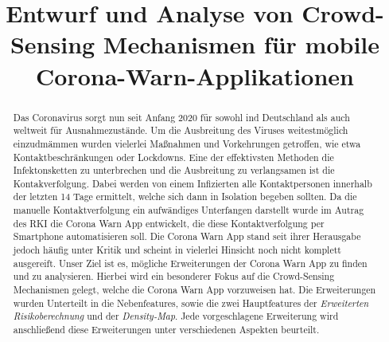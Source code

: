 \documentclass[conference,compsoc]{IEEEtran}
\begin{document}
\title{Entwurf und Analyse von Crowd-Sensing Mechanismen für mobile Corona-Warn-Applikationen}

\author{
\and
{} 
\and
{}
\and
{}
}

\maketitle

\begin{abstract}
Das Coronavirus sorgt nun seit Anfang 2020 für sowohl ind Deutschland als auch weltweit für Ausnahmezustände. 
Um die Ausbreitung des Viruses weitestmöglich einzudmämmen wurden vielerlei Maßnahmen und Vorkehrungen getroffen, wie etwa Kontaktbeschränkungen oder Lockdowns.
Eine der effektivsten Methoden die Infektonsketten zu unterbrechen und die Ausbreitung zu verlangsamen ist die Kontakverfolgung. 
Dabei werden von einem Infizierten alle Kontaktpersonen innerhalb der letzten 14 Tage ermittelt, welche sich dann in Isolation begeben sollten. 
Da die manuelle Kontaktverfolgung ein aufwändiges Unterfangen darstellt wurde im Autrag des RKI die Corona Warn App entwickelt, die diese Kontaktverfolgung per Smartphone automatisieren soll. 
Die Corona Warn App stand seit ihrer Herausgabe jedoch häufig unter Kritik und scheint in vielerlei Hinsicht noch nicht komplett ausgereift.
Unser Ziel ist es, mögliche Erweiterungen der Corona Warn App zu finden und  zu analysieren.
Hierbei wird ein besonderer Fokus auf die Crowd-Sensing Mechanismen gelegt, welche die Corona Warn App vorzuweisen hat. 
Die Erweiterungen wurden Unterteilt in die Nebenfeatures, sowie die zwei Hauptfeatures der \textit{Erweiterten Risikoberechnung} und der \textit{Density-Map}.
Jede vorgeschlagene Erweiterung wird anschließend diese Erweiterungen unter verschiedenen Aspekten beurteilt. 
\end{abstract}
\end{document}
